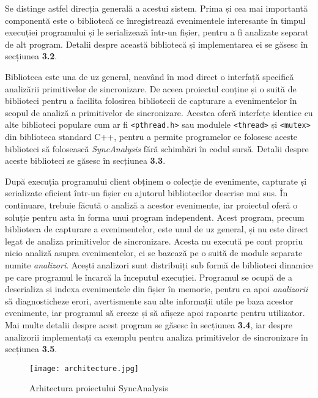 Se distinge astfel direcția generală a acestui sistem. Prima și cea mai
importantă componentă este o bibliotecă ce înregistrează evenimentele
interesante în timpul execuției programului și le serializează într-un
fișier, pentru a fi analizate separat de alt program. Detalii despre
această bibliotecă și implementarea ei se găsesc în secțiunea
\textbf{3.2}.

Biblioteca este una de uz general, neavând în mod direct o interfață
specifică analizării primitivelor de sincronizare. De aceea proiectul
conține și o suită de biblioteci pentru a facilita folosirea bibliotecii
de capturare a evenimentelor în scopul de analiză a primitivelor de
sincronizare. Acestea oferă interfețe identice cu alte biblioteci
populare cum ar fi \lstinline{<pthread.h>} sau modulele
\lstinline{<thread>} și \lstinline{<mutex>} din biblioteca standard C++,
pentru a permite programelor ce folosesc aceste biblioteci să folosească
\textit{SyncAnalysis} fără schimbări în codul sursă. Detalii despre
aceste biblioteci se găsesc în secțiunea \textbf{3.3}.

După execuția programului client obținem o colecție de evenimente,
capturate și serializate eficient într-un fișier cu ajutorul
bibliotecilor descrise mai sus. În continuare, trebuie făcută o analiză
a acestor evenimente, iar proiectul oferă o soluție pentru asta în forma
unui program independent. Acest program, precum biblioteca de capturare
a evenimentelor, este unul de uz general, și nu este direct legat de
analiza primitivelor de sincronizare. Acesta nu execută pe cont propriu
nicio analiză asupra evenimentelor, ci se bazează pe o suită de module
separate numite \textit{analizori}. Acești analizori sunt distribuiți
sub formă de biblioteci dinamice pe care programul le încarcă la
începutul execuției. Programul se ocupă de a deserializa și indexa
evenimentele din fișier în memorie, pentru ca apoi \textit{analizorii}
să diagnosticheze erori, avertismente sau alte informații utile pe baza
acestor evenimente, iar programul să creeze și să afișeze apoi rapoarte
pentru utilizator. Mai multe detalii despre acest program se găsesc în
secțiunea \textbf{3.4}, iar despre analizorii implementați ca exemplu
pentru analiza primitivelor de sincronizare în secțiunea \textbf{3.5}.

\begin{figure}[h]
\centering
\texttt{[image: architecture.jpg]}
\caption{Arhitectura proiectului SyncAnalysis}
\label{fig:architecture}
\end{figure}

